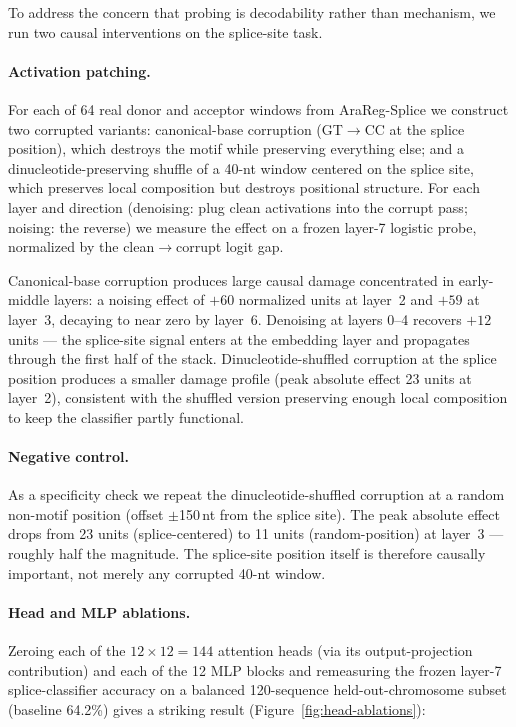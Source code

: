 \documentclass[11pt, a4paper]{article}
\begin{document}
To address the concern that probing is decodability rather than
mechanism, we run two causal interventions on the splice-site task.

\paragraph{Activation patching.}
For each of 64 real donor and acceptor windows from AraReg-Splice we
construct two corrupted variants: canonical-base corruption (GT$\to$CC at
the splice position), which destroys the motif while preserving
everything else; and a dinucleotide-preserving shuffle of a 40-nt window
centered on the splice site, which preserves local composition but
destroys positional structure. For each layer and direction (denoising:
plug clean activations into the corrupt pass; noising: the reverse) we
measure the effect on a frozen layer-7 logistic probe, normalized by the
clean$\to$corrupt logit gap.

Canonical-base corruption produces large causal damage concentrated in
early-middle layers: a noising effect of $+60$ normalized units at
layer~2 and $+59$ at layer~3, decaying to near zero by layer~6.
Denoising at layers 0--4 recovers $+12$ units --- the splice-site signal
enters at the embedding layer and propagates through the first half of
the stack. Dinucleotide-shuffled corruption at the splice position
produces a smaller damage profile (peak absolute effect 23 units at
layer~2), consistent with the shuffled version preserving enough local
composition to keep the classifier partly functional.

\paragraph{Negative control.}
As a specificity check we repeat the dinucleotide-shuffled corruption at
a random non-motif position (offset $\pm$150\,nt from the splice site).
The peak absolute effect drops from 23 units (splice-centered) to 11
units (random-position) at layer~3 --- roughly half the magnitude. The
splice-site position itself is therefore causally important, not merely
any corrupted 40-nt window.

\paragraph{Head and MLP ablations.}
Zeroing each of the $12 \times 12 = 144$ attention heads (via its
output-projection contribution) and each of the 12 MLP blocks and
remeasuring the frozen layer-7 splice-classifier accuracy on a balanced
120-sequence held-out-chromosome subset (baseline 64.2\%) gives a
striking result (Figure~\ref{fig:head-ablations}):
\end{document}
